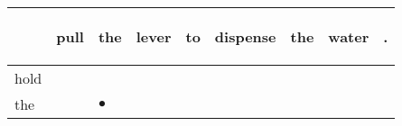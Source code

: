 \documentclass[landscape]{article}
\newcommand{\ssp}{\hspace{2pt}}
\newcommand{\mex}{\cellcolor{g}$\bullet$}
\begin{document}
\noindent\begin{tabular}{|l|p{10pt}|p{10pt}|p{10pt}|p{10pt}|p{10pt}|p{10pt}|p{10pt}|p{10pt}|}
\hline
&\begin{sideways}\cellcolor{ref0}pull\hspace{12pt}\end{sideways}&\begin{sideways}\cellcolor{ref1}the\hspace{12pt}\end{sideways}&\begin{sideways}\cellcolor{ref2}lever\hspace{12pt}\end{sideways}&\begin{sideways}\cellcolor{ref3}to\hspace{12pt}\end{sideways}&\begin{sideways}\cellcolor{ref4}dispense\hspace{12pt}\end{sideways}&\begin{sideways}\cellcolor{ref5}the\hspace{12pt}\end{sideways}&\begin{sideways}\cellcolor{ref6}water\hspace{12pt}\end{sideways}&\begin{sideways}\cellcolor{ref7}.\hspace{12pt}\end{sideways}\\
\hline
\ssp hold \ssp&\hspace{2pt}&\hspace{2pt}&\hspace{2pt}&\hspace{2pt}&\hspace{2pt}&\hspace{2pt}&\hspace{2pt}&\hspace{2pt}\\
\hline
\ssp \cellcolor{ref1}the \ssp&\hspace{2pt}&\hspace{2pt}\mex&\hspace{2pt}&\hspace{2pt}&\hspace{2pt}&\hspace{2pt}&\hspace{2pt}&\hspace{2pt}\\

\end{tabular}
\end{document}

